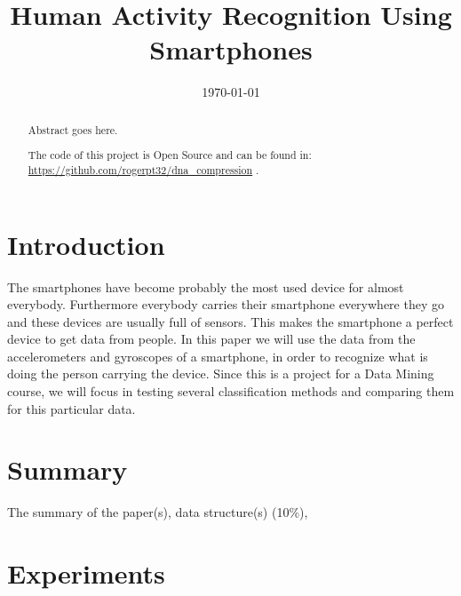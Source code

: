 \documentclass[conference,a4paper]{IEEEtran}
\begin{document}
\title{Human Activity Recognition Using Smartphones}

\author{
}

\date{\today}

\maketitle

\begin{abstract}
Abstract goes here.

The code of this project is Open Source and can be found in: \url{https://github.com/rogerpt32/dna_compression} \cite{code}.
\end{abstract}

\section{Introduction}
The smartphones have become probably the most used device for almost everybody. Furthermore everybody carries their smartphone everywhere they go and these devices are usually full of sensors. This makes the smartphone a perfect device to get data from people. In this paper we will use the data from the accelerometers and gyroscopes of a smartphone, in order to recognize what is doing the person carrying the device. Since this is a project for a Data Mining course, we will focus in testing several classification methods and comparing them for this particular data.

\section{Summary}
The summary of the paper(s), data structure(s) (10\%),

\section{Experiments}
\end{document}

